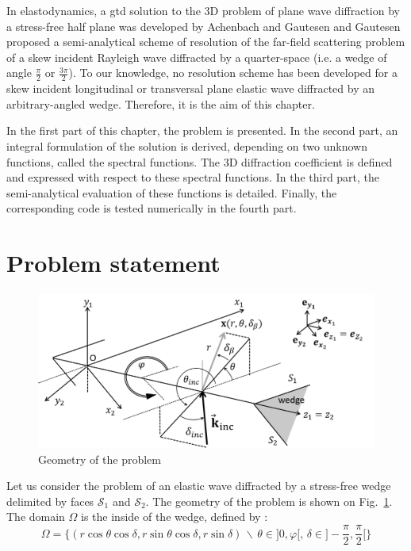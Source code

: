 In elastodynamics, a \acrshort{gtd} solution to the 3D problem of plane wave diffraction by a stress-free half plane was developed by Achenbach and Gautesen \cite{Achenbach,AchenbachGautesen,GautesenNote} and Gautesen \cite{GautesenRayleigh4,GautesenRayleigh3} proposed a semi-analytical scheme of resolution of the far-field scattering problem of a skew incident Rayleigh wave diffracted by a quarter-space (i.e. a wedge of angle $\frac{\pi}{2}$ or $\frac{3\pi}{2}$). To our knowledge, no resolution scheme has been developed for a skew incident longitudinal or transversal plane elastic wave diffracted by an arbitrary-angled wedge. Therefore, it is the aim of this chapter.

In the first part of this chapter, the problem is presented. In the second part, an integral formulation of the solution is derived, depending on two unknown functions, called the spectral functions. The 3D diffraction coefficient is defined and expressed with respect to these spectral functions. In the third part, the semi-analytical evaluation of these functions is detailed. Finally, the corresponding code is tested numerically in the fourth part.
\section{Problem statement}

\begin{figure}[h]
\centering
	\includegraphics[width=\textwidth]{images/chapter4/wedge_3D.png}
\caption{Geometry of the problem}
\label{diedre_coords}
\end{figure}

Let us consider the problem of an elastic wave diffracted by a stress-free wedge delimited by faces $\mathcal{S}_1$ and $\mathcal{S}_2$. The geometry of the problem is shown on Fig.~\ref{diedre_coords}. The domain $\Omega$ is the inside of the wedge, defined by :
\begin{equation}
\Omega=\{ (r\cos \theta \cos \delta, r \sin \theta \cos \delta, r \sin \delta)\, \backslash \, \theta \in \rbrack 0, \varphi \lbrack, \, \delta \in \rbrack -\frac{\pi}{2}, \frac{\pi}{2} \lbrack \}
\end{equation}

